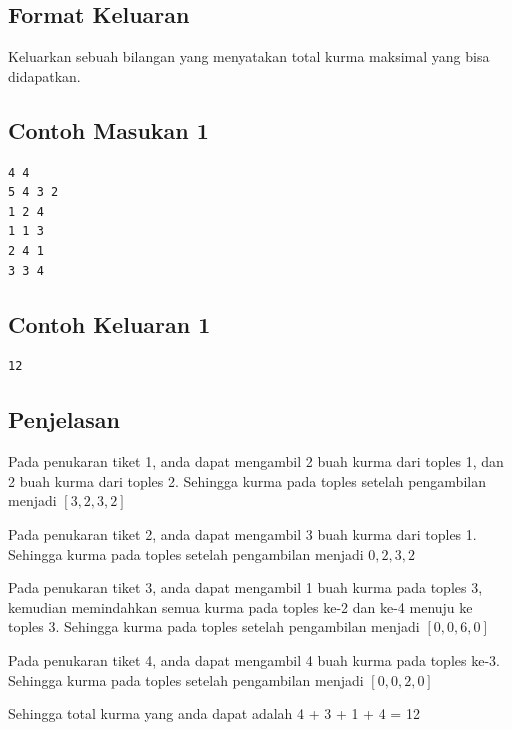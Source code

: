 \documentclass{article}
\begin{document}
\subsection*{Format Keluaran}
Keluarkan sebuah bilangan yang menyatakan total kurma maksimal yang bisa didapatkan.


\begin{multicols}{2}
\subsection*{Contoh Masukan 1}
\begin{lstlisting}
4 4
5 4 3 2
1 2 4
1 1 3
2 4 1
3 3 4
\end{lstlisting}
\columnbreak
\subsection*{Contoh Keluaran 1}
\begin{lstlisting}
12
\end{lstlisting}
\vfill
\null
\end{multicols}

\subsection*{Penjelasan}
Pada penukaran tiket 1, anda dapat mengambil 2 buah kurma dari toples 1, dan 2 buah kurma dari toples 2. Sehingga kurma pada toples setelah pengambilan menjadi $[3, 2, 3, 2]$

Pada penukaran tiket 2, anda dapat mengambil 3 buah kurma dari toples 1. Sehingga kurma pada toples setelah pengambilan menjadi $0, 2, 3, 2$

Pada penukaran tiket 3, anda dapat mengambil 1 buah kurma pada toples 3, kemudian memindahkan semua kurma pada toples ke-2 dan ke-4 menuju ke toples 3. Sehingga kurma pada toples setelah pengambilan menjadi $[0, 0, 6, 0]$

Pada penukaran tiket 4, anda dapat mengambil 4 buah kurma pada toples ke-3. Sehingga kurma pada toples setelah pengambilan menjadi $[0, 0, 2, 0]$

Sehingga total kurma yang anda dapat adalah 4 + 3 + 1 + 4 = 12
\end{document}
